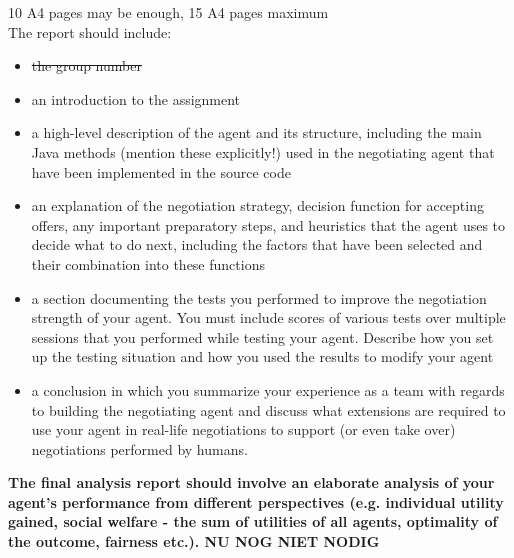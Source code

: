 \documentclass[11pt,a4paper]{article}
\begin{document}
10 A4 pages may be enough, 15 A4 pages maximum\\
The report should include:\\
\begin{itemize}
\item \st{the group number}
\item an introduction to the assignment
\item a high-level description of the agent and its structure, including the main Java methods (mention
these explicitly!) used in the negotiating agent that have been implemented in the source code
\item an explanation of the negotiation strategy, decision function for accepting offers, any important
preparatory steps, and heuristics that the agent uses to decide what to do next, including the factors
that have been selected and their combination into these functions
\item a section documenting the tests you performed to improve the negotiation strength of your agent.
You must include scores of various tests over multiple sessions that you performed while testing
your agent. Describe how you set up the testing situation and how you used the results to modify
your agent
\item a conclusion in which you summarize your experience as a team with regards to building the
negotiating agent and discuss what extensions are required to use your agent in real-life negotiations
to support (or even take over) negotiations performed by humans.
\end{itemize}

\textbf{The final analysis report should involve an elaborate analysis of your agent's performance from different perspectives (e.g. individual utility gained, social welfare - the sum of utilities of all agents, optimality of the outcome, fairness etc.). NU NOG NIET NODIG}
\end{document}

